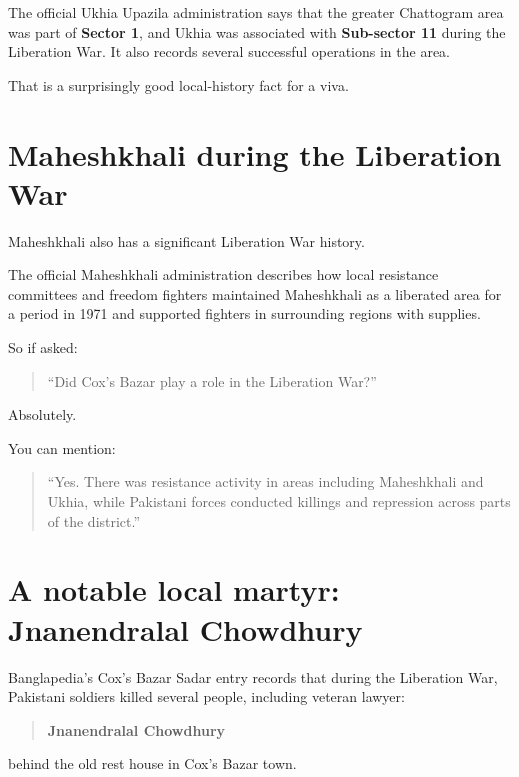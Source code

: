 The official Ukhia Upazila administration says that the greater Chattogram area was part of \textbf{Sector 1}, and Ukhia was associated with \textbf{Sub-sector 11} during the Liberation War. It also records several successful operations in the area.

That is a surprisingly good local-history fact for a viva.

\medskip

\section{Maheshkhali during the Liberation War}

Maheshkhali also has a significant Liberation War history.

The official Maheshkhali administration describes how local resistance committees and freedom fighters maintained Maheshkhali as a liberated area for a period in 1971 and supported fighters in surrounding regions with supplies.

So if asked:

\begin{quote}
``Did Cox's Bazar play a role in the Liberation War?''\\
\end{quote}

Absolutely.

You can mention:

\begin{quote}
``Yes. There was resistance activity in areas including Maheshkhali and Ukhia, while Pakistani forces conducted killings and repression across parts of the district.''\\
\end{quote}

\medskip

\section{A notable local martyr: Jnanendralal Chowdhury}

Banglapedia's Cox's Bazar Sadar entry records that during the Liberation War, Pakistani soldiers killed several people, including veteran lawyer:

\begin{quote}
\textbf{Jnanendralal Chowdhury}\\
\end{quote}

behind the old rest house in Cox's Bazar town.

